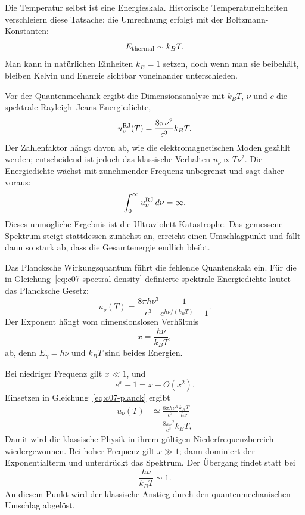Die Temperatur selbst ist eine Energieskala. Historische Temperatureinheiten verschleiern diese Tatsache; die Umrechnung erfolgt mit der Boltzmann-Konstanten:
\begin{equation}
E_{\rm thermal}\sim k_B T.
\end{equation}
Man kann in natürlichen Einheiten \(k_B=1\) setzen, doch wenn man sie beibehält, bleiben Kelvin und Energie sichtbar voneinander unterschieden.

Vor der Quantenmechanik ergibt die Dimensionsanalyse mit \(k_BT\), \(\nu\) und \(c\) die spektrale Rayleigh--Jeans-Energiedichte,
\begin{equation}
u_\nu^{\rm RJ}(T)=\frac{8\pi\nu^2}{c^3}k_BT.
\label{eq:c07-rayleigh-jeans}
\end{equation}
Der Zahlenfaktor hängt davon ab, wie die elektromagnetischen Moden gezählt werden; entscheidend ist jedoch das klassische Verhalten \(u_\nu\propto T\nu^2\). Die Energiedichte wächst mit zunehmender Frequenz unbegrenzt und sagt daher voraus:
\begin{equation}
\int_0^\infty u_\nu^{\rm RJ}\,d\nu=\infty.
\end{equation}
Dieses unmögliche Ergebnis ist die Ultraviolett-Katastrophe. Das gemessene Spektrum steigt stattdessen zunächst an, erreicht einen Umschlagpunkt und fällt dann so stark ab, dass die Gesamtenergie endlich bleibt.

Das Plancksche Wirkungsquantum führt die fehlende Quantenskala ein. Für die in Gleichung~\eqref{eq:c07-spectral-density} definierte spektrale Energiedichte lautet das Plancksche Gesetz:
\begin{equation}
u_\nu(T)
=
\frac{8\pi h\nu^3}{c^3}
\frac{1}{e^{h\nu/(k_BT)}-1}.
\label{eq:c07-planck}
\end{equation}
Der Exponent hängt vom dimensionslosen Verhältnis
\begin{equation}
x=\frac{h\nu}{k_BT},
\end{equation}
ab, denn \(E_\gamma=h\nu\) und \(k_BT\) sind beides Energien.

Bei niedriger Frequenz gilt \(x\ll1\), und
\begin{equation}
e^x-1=x+O(x^2).
\end{equation}
Einsetzen in Gleichung~\eqref{eq:c07-planck} ergibt
\begin{align}
u_\nu(T)
&\simeq
\frac{8\pi h\nu^3}{c^3}
\frac{k_BT}{h\nu}
\\
&=
\frac{8\pi\nu^2}{c^3}k_BT,
\end{align}
Damit wird die klassische Physik in ihrem gültigen Niederfrequenzbereich wiedergewonnen. Bei hoher Frequenz gilt \(x\gg1\); dann dominiert der Exponentialterm und unterdrückt das Spektrum. Der Übergang findet statt bei
\begin{equation}
\frac{h\nu}{k_BT}\sim1.
\label{eq:c07-crossover}
\end{equation}
An diesem Punkt wird der klassische Anstieg durch den quantenmechanischen Umschlag abgelöst.

